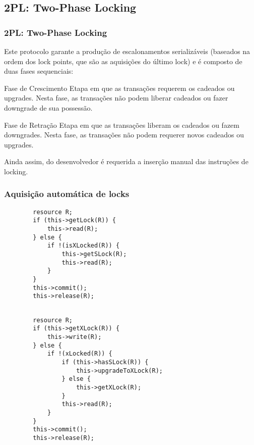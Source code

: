 \documentclass{beamer}
\begin{document}
\subsection{2PL: Two-Phase Locking}
\begin{frame}
    \frametitle{2PL: Two-Phase Locking}

    Este protocolo garante a produção de escalonamentos serializáveis (baseados na ordem dos lock points, que são as aquisições do último lock) e é composto de duas fases sequenciais:

    \begin{block}{Fase de Crescimento}
        Etapa em que as transações requerem os cadeados ou upgrades. Nesta fase, as transações não podem liberar cadeados ou fazer downgrade de sua possessão.
    \end{block}

    \begin{block}{Fase de Retração}
        Etapa em que as transações liberam os cadeados ou fazem downgrades. Nesta fase, as transações não podem requerer novos cadeados ou upgrades.
    \end{block}

    Ainda assim, do desenvolvedor é requerida a inserção manual das instruções de locking.
\end{frame}


\begin{frame}[fragile] %
    \frametitle{Aquisição automática de locks}
    \begin{example}
    \begin{verbatim}
        resource R;
        if (this->getLock(R)) {
            this->read(R);
        } else {
            if !(isXLocked(R)) {
                this->getSLock(R);
                this->read(R);
            }
        }
        this->commit();
        this->release(R);
    
    \end{verbatim}
    \end{example}
\end{frame}


\begin{frame}[fragile] %
    \begin{example}
    \begin{verbatim}
        resource R;
        if (this->getXLock(R)) {
            this->write(R);
        } else {
            if !(xLocked(R)) {
                if (this->hasSLock(R)) {
                    this->upgradeToXLock(R);
                } else {
                    this->getXLock(R);
                }
                this->read(R);
            }
        }
        this->commit();
        this->release(R);
    
    \end{verbatim}
    \end{example}
\end{frame}
\end{document}
